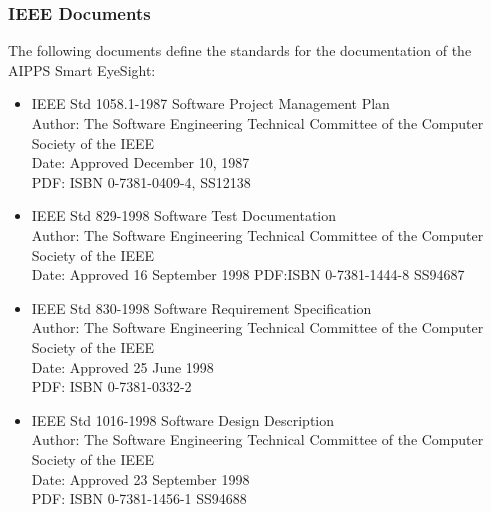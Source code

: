 \documentclass[12pt]{article}
\begin{document}
\subsubsection{IEEE Documents}
The following documents define the standards for the documentation of the AIPPS Smart EyeSight:
\begin{itemize}
  \item IEEE Std 1058.1-1987  Software Project Management Plan\\
				Author: The Software Engineering Technical Committee of the Computer Society of the IEEE\\
                Date: Approved December 10, 1987\\
				PDF: ISBN 0-7381-0409-4, SS12138

  \item IEEE Std 829-1998  Software Test Documentation\\
				Author: The Software Engineering Technical Committee of the Computer Society of the IEEE\\
                Date: Approved 16 September 1998
				PDF:ISBN 0-7381-1444-8 SS94687

  \item IEEE Std 830-1998 Software Requirement Specification \\
				Author: The Software Engineering Technical Committee of the Computer Society of the IEEE \\
                Date: Approved 25 June 1998\\
				PDF: ISBN 0-7381-0332-2

  \item IEEE Std 1016-1998 Software Design Description\\
				Author: The Software Engineering Technical Committee of the Computer Society of the IEEE\\
                Date: Approved 23 September 1998\\
				PDF: ISBN 0-7381-1456-1 SS94688	
\end{itemize}
\end{document}
